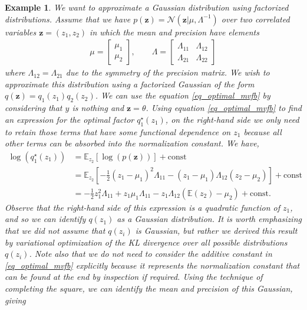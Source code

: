 \documentclass[10pt ]{article}
\newtheorem{example}{Example}
\begin{document}
\begin{example}
{\em We want to approximate a Gaussian distribution using factorized distributions.  Assume that we have $p( \mathbf{z} )= \mathcal{N}(  \mathbf{z}  | \mu, \Lambda^{-1})$ over two correlated variables $\mathbf{z}  = (z_1,z_2)$ in which the mean and precision have elements
\begin{align}
\mu = \begin{bmatrix}
\mu_1 \\ \mu_2
\end{bmatrix}, 
\qquad 
\Lambda = \begin{bmatrix}
\Lambda_{11} & \Lambda_{12} \\ \Lambda_{21} & \Lambda_{22} 
\end{bmatrix} 
\end{align}
where $ \Lambda_{12} = \Lambda_{21} $ due to the symmetry of the precision matrix. We wish to approximate this distribution using a factorized Gaussian of the form $q(\mathbf{z}) = q_1(z_1)q_2(z_2)$. We can use the equation \eqref{eq_optimal_mvfb} by considering that $y$ is nothing and $\mathbf{z} = \theta$. Using equation \eqref{eq_optimal_mvfb} to find an expression for the optimal factor $q_1^{\star}(z_1)$, on the right-hand side we only need to retain those terms that have some functional dependence on $z_1$ because all other terms can be absorbed into the normalization constant. We have,
\begin{align}
\log (q_1^{\star}(z_1)) &= \mathbb{E}_{z_2} \left[ \log \left( p(\mathbf{z}  ) \right) \right] + \mathrm{const} \nonumber \\
&= \mathbb{E}_{z_2} \left[ -\frac{1}{2} (z_1 - \mu_1)^2 \Lambda_{11} - (z_1 - \mu_1) \Lambda_{12} (z_2 - \mu_2)  \right] + \mathrm{const} \nonumber \\
&= -\frac{1}{2} z_1^2 \Lambda_{11}  + z_1 \mu_1 \Lambda_{11} - z_1 \Lambda_{12} (\mathbb{E}(z_2) -\mu_2) +  \mathrm{const}.
\label{eq_ex_1}
\end{align}
Observe that the right-hand side of this expression is a quadratic function of $z_1$, and so we can identify $q(z_1)$ as a Gaussian distribution. It is worth emphasizing that we did not assume that $q(z_i)$ is Gaussian, but rather we derived this result by variational optimization of the KL divergence over all possible distributions $q(z_i)$. Note also that we do not need to consider the additive constant in \eqref{eq_optimal_mvfb} explicitly because it represents the normalization constant that can be found at the end by inspection if required. Using the technique of completing the square, we can identify the mean and precision of this Gaussian, giving
}
\end{example}
\end{document}

